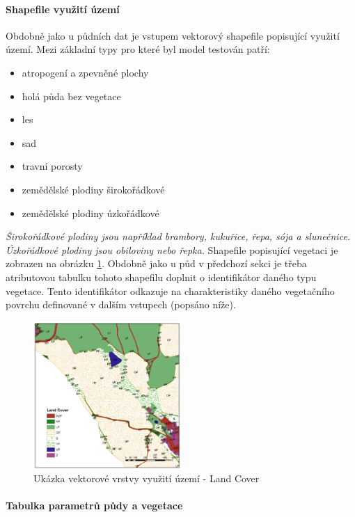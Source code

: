  
\paragraph{Shapefile využití území} \label{sec:vstupvegetace}

Obdobně jako u půdních dat je vstupem vektorový shapefile popisující využití území. Mezi základní typy pro které byl model testován patří:
\begin{itemize} \itemsep 0pt
  \item atropogení a zpevněné plochy  
  \item holá půda bez vegetace
  \item les
  \item sad
  \item travní porosty
  \item zemědělské plodiny širokořádkové
  \item zemědělské plodiny úzkořádkové
\end{itemize}

\textit{Širokořádkové plodiny jsou například brambory, kukuřice, řepa, sója a slunečnice. Úzkořádkové plodiny jsou obiloviny nebo řepka.}
Shapefile popisující vegetaci je zobrazen na obrázku \ref{fig:bykovicevegetace}. Obdobně jako u půd v předchozí sekci je třeba atributovou tabulku tohoto shapefilu doplnit o identifikátor daného typu vegetace. Tento identifikátor odkazuje na charakteristiky daného vegetačního povrchu definované v dalším vstupech (popsáno níže).

\begin{figure}
  \centering
  \includegraphics[width=0.5\textwidth]{./img/LandCover.png}
  \caption{Ukázka vektorové vrstvy využití území -  Land Cover}
  \label{fig:bykovicevegetace}
\end{figure}



\paragraph{Tabulka parametrů půdy a vegetace}  \label{sec:upravatabulkyparametru}


